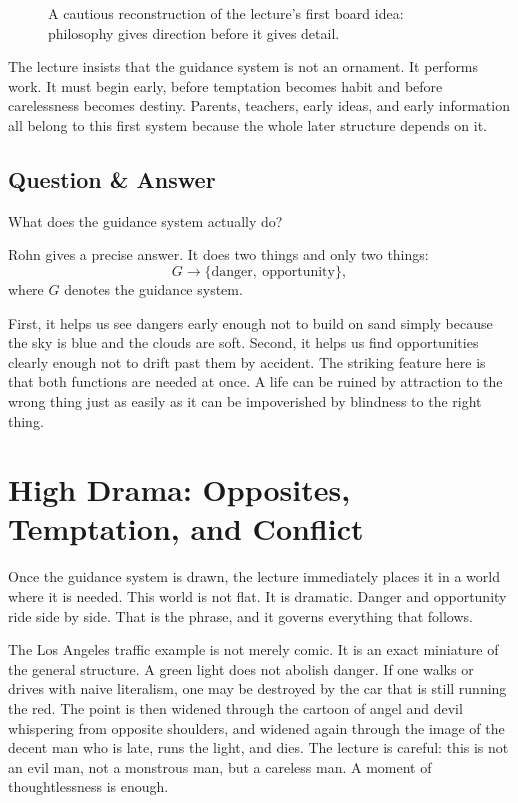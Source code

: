 \begin{figure}[h]
\centering
{}
\caption{A cautious reconstruction of the lecture's first board idea: philosophy gives direction before it gives detail.}
\end{figure}

The lecture insists that the guidance system is not an ornament. It performs work. It must begin early, before temptation becomes habit and before carelessness becomes destiny. Parents, teachers, early ideas, and early information all belong to this first system because the whole later structure depends on it.

\subsection{Question \& Answer}

What does the guidance system actually do?

Rohn gives a precise answer. It does two things and only two things:
\begin{equation}
G \longrightarrow \{\text{danger},\ \text{opportunity}\},
\end{equation}
where \(G\) denotes the guidance system.

First, it helps us see dangers early enough not to build on sand simply because the sky is blue and the clouds are soft. Second, it helps us find opportunities clearly enough not to drift past them by accident. The striking feature here is that both functions are needed at once. A life can be ruined by attraction to the wrong thing just as easily as it can be impoverished by blindness to the right thing.

\section{High Drama: Opposites, Temptation, and Conflict}

Once the guidance system is drawn, the lecture immediately places it in a world where it is needed. This world is not flat. It is dramatic. Danger and opportunity ride side by side. That is the phrase, and it governs everything that follows.

The Los Angeles traffic example is not merely comic. It is an exact miniature of the general structure. A green light does not abolish danger. If one walks or drives with naive literalism, one may be destroyed by the car that is still running the red. The point is then widened through the cartoon of angel and devil whispering from opposite shoulders, and widened again through the image of the decent man who is late, runs the light, and dies. The lecture is careful: this is not an evil man, not a monstrous man, but a careless man. A moment of thoughtlessness is enough.

